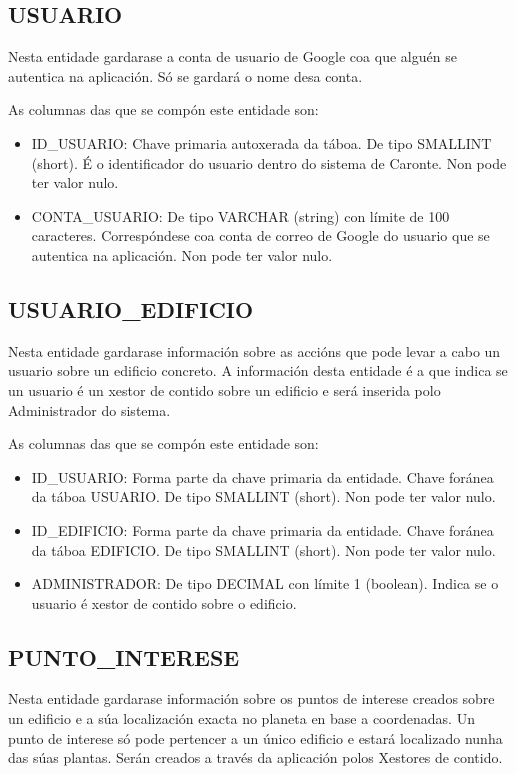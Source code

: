 \subsection{USUARIO}
Nesta entidade gardarase a conta de usuario de Google coa que alguén se autentica na aplicación. Só se gardará o nome desa conta.

As columnas das que se compón este entidade son:
\begin{itemize}
	\item ID\_USUARIO: Chave primaria autoxerada da táboa. De tipo SMALLINT (short). É o identificador do usuario dentro do sistema de Caronte. Non pode ter valor nulo.
	\item CONTA\_USUARIO: De tipo VARCHAR (string) con límite de 100 caracteres. Correspóndese coa conta de correo de Google do usuario que se autentica na aplicación. Non pode ter valor nulo.
\end{itemize}

\subsection{USUARIO\_EDIFICIO}
Nesta entidade gardarase información sobre as accións que pode levar a cabo un usuario sobre un edificio concreto. A información desta entidade é a que indica se un usuario é un xestor de contido sobre un edificio e será inserida polo Administrador do sistema.

As columnas das que se compón este entidade son:
\begin{itemize}
	\item ID\_USUARIO: Forma parte da chave primaria da entidade. Chave foránea da táboa USUARIO. De tipo SMALLINT (short). Non pode ter valor nulo.
	\item ID\_EDIFICIO: Forma parte da chave primaria da entidade. Chave foránea da táboa EDIFICIO. De tipo SMALLINT (short). Non pode ter valor nulo.
	\item ADMINISTRADOR: De tipo DECIMAL con límite 1 (boolean). Indica se o usuario é xestor de contido sobre o edificio.
\end{itemize}


\subsection{PUNTO\_INTERESE}
Nesta entidade gardarase información sobre os puntos de interese creados sobre un edificio e a súa localización exacta no planeta en base a coordenadas. Un punto de interese só pode pertencer a un único edificio e estará localizado nunha das súas plantas. Serán creados a través da aplicación polos Xestores de contido.

